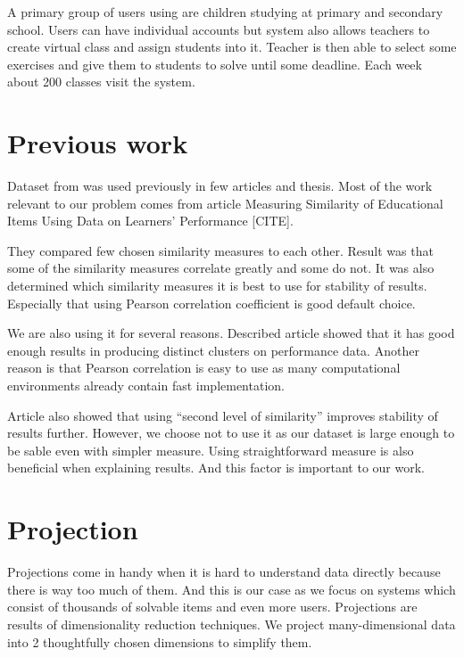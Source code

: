 \documentclass[
  digital, %
  table,   %
  nolof,     %
  nolot,     %
  nocover
]{fithesis3}
\begin{document}

A primary group of users using \umimeCesky{} are children studying at primary and secondary school. Users can have individual accounts
but system also allows teachers to create virtual class and assign students into it. Teacher is then able to select some exercises and give them to students to solve until some deadline. Each week about 200 classes visit the system.

\section{Previous work}\label{previous-work}

Dataset from \umimeCesky{} was used previously in few articles and thesis. Most of the work relevant to our problem comes from article Measuring Similarity of Educational Items Using Data on Learners’ Performance [CITE].

They compared few chosen similarity measures to each other. Result was that some of the similarity measures correlate greatly and some do not. It was also determined which similarity measures it is best to use for stability of results. Especially that using Pearson correlation coefficient is good default choice.

We are also using it for several reasons. Described article showed that it has good enough results in producing distinct clusters on performance data. Another reason is that Pearson correlation is easy to use as many computational environments already contain fast implementation.

Article also showed that using ``second level of similarity'' improves stability of results further. However, we choose not to use it as our dataset is large enough to be sable even with simpler measure. Using straightforward measure is also beneficial when explaining results. And this factor is important to our work.


\section{Projection}\label{projection}


Projections come in handy when it is hard to understand data directly because there is way too much of them. And this is our case as we focus on systems which consist of thousands of solvable items and even more users. Projections are results of dimensionality reduction techniques. We project many-dimensional data into 2 thoughtfully chosen dimensions to simplify them.
\end{document}

